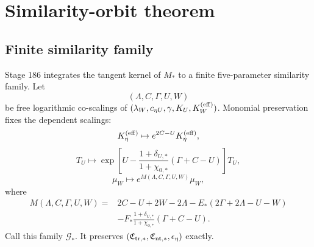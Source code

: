 
\section{Similarity-orbit theorem}
\label{sec:part05_weak_axisymmetric_orbit:similarity-orbit-theorem}

\subsection{Finite similarity family}
Stage 186 integrates the tangent kernel of \(M_*\) to a finite five-parameter similarity family.  Let
\begin{equation}
\label{eq:part05-free-log-scalings}
(\Lambda,C,\Gamma,U,W)
\end{equation}
be free logarithmic co-scalings of
\((\lambda_W,c_{\eta U},\gamma,K_U,K_W^{({\rm eff})})\).  Monomial preservation fixes the dependent scalings:
\begin{equation}
\label{eq:part05-Keta-orbit-law}
K_\eta^{({\rm eff})}\mapsto e^{2C-U}K_\eta^{({\rm eff})},
\end{equation}
\begin{equation}
\label{eq:part05-TU-orbit-law}
T_U\mapsto
\exp\!\left[
U-\frac{1+\delta_{U,*}}{1+\chi_{0,*}}(\Gamma+C-U)
\right]T_U,
\end{equation}
\begin{equation}
\label{eq:part05-muW-orbit-law}
\mu_W\mapsto e^{M(\Lambda,C,\Gamma,U,W)}\mu_W,
\end{equation}
where
\begin{equation}
\label{eq:part05-M-exponent-orbit-law}
\begin{aligned}
M(\Lambda,C,\Gamma,U,W)={}&
2C-U+2W-2\Lambda
-E_*(2\Gamma+2\Lambda-U-W)\\
&-F_*\frac{1+\delta_{U,*}}{1+\chi_{0,*}}(\Gamma+C-U).
\end{aligned}
\end{equation}
Call this family \(\mathcal G_*\).  It preserves \((\mathfrak C_{{\rm tr},*},\mathfrak C_{{\rm nt},*},\epsilon_\eta)\) exactly.

